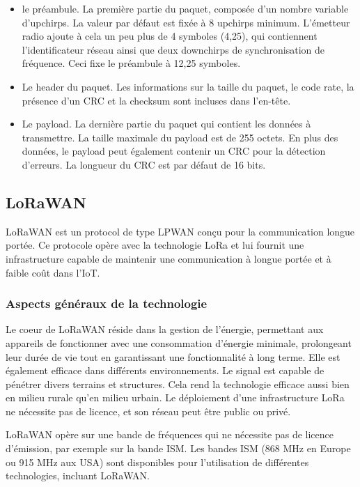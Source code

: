 \begin{itemize}
\item le préambule. La première partie du paquet, composée d'un nombre variable d'upchirps. La valeur par défaut est fixée à 8 upchirps minimum. L'émetteur radio ajoute à cela un peu plus de 4 symboles (4,25), qui contiennent l'identificateur réseau ainsi que deux downchirps de synchronisation de fréquence. Ceci fixe le préambule à 12,25 symboles.
\item Le header du paquet. Les informations sur la taille du paquet, le code rate, la présence d'un \ac{CRC} et la checksum sont incluses dans l'en-tête.
\item Le payload. La dernière partie du paquet qui contient les données à transmettre. La taille maximale du payload est de 255 octets. En plus des données, le payload peut également contenir un \ac{CRC} pour la détection d'erreurs. La longueur du \ac{CRC} est par défaut de 16 bits.
\end{itemize}

\newpage
\subsection{LoRaWAN}\label{lorawan}

LoRaWAN est un protocol de type \ac{LPWAN} conçu pour la communication longue portée. Ce protocole opère avec la technologie \ac{LoRa} et lui fournit une infrastructure capable de maintenir une communication à longue portée et à faible coût dans l'\ac{IoT}.

\subsubsection{Aspects généraux de la technologie}

Le coeur de LoRaWAN réside dans la gestion de l'énergie, permettant aux appareils de fonctionner avec une consommation d'énergie minimale, prolongeant leur durée de vie tout en garantissant une fonctionnalité à long terme. Elle est également efficace dans différents environnements. Le signal est capable de pénétrer divers terrains et structures. Cela rend la technologie efficace aussi bien en milieu rurale qu'en milieu urbain.
Le déploiement d'une infrastructure \ac{LoRa} ne nécessite pas de licence, et son réseau peut être public ou privé.

\vspace{0.1cm}

LoRaWAN opère sur une bande de fréquences qui ne nécessite pas de licence d'émission, par exemple sur la bande \ac{ISM}. Les bandes \ac{ISM} (868 MHz en Europe ou 915 MHz aux USA) sont disponibles pour l'utilisation de différentes technologies, incluant LoRaWAN.

